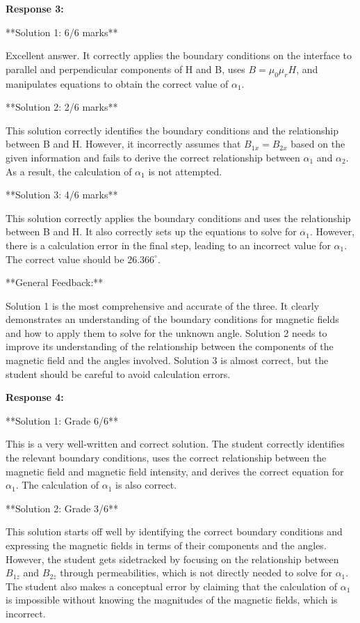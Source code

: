 \documentclass[a4paper,11pt]{article}
\begin{document}
\textbf{Response 3:}

**Solution 1: 6/6 marks**

Excellent answer. It correctly applies the boundary conditions on the interface to parallel and perpendicular components of H and B, uses \( B = \mu_0 \mu_r H \), and manipulates equations to obtain the correct value of \( \alpha_1 \).

**Solution 2: 2/6 marks**

This solution correctly identifies the boundary conditions and the relationship between B and H. However, it incorrectly assumes that \( B_{1x} = B_{2x} \) based on the given information and fails to derive the correct relationship between \( \alpha_1 \) and \( \alpha_2 \). As a result, the calculation of \( \alpha_1 \) is not attempted.

**Solution 3: 4/6 marks**

This solution correctly applies the boundary conditions and uses the relationship between B and H. It also correctly sets up the equations to solve for \( \alpha_1 \). However, there is a calculation error in the final step, leading to an incorrect value for \( \alpha_1 \). The correct value should be \(26.366^\circ\).

**General Feedback:**

Solution 1 is the most comprehensive and accurate of the three. It clearly demonstrates an understanding of the boundary conditions for magnetic fields and how to apply them to solve for the unknown angle. Solution 2 needs to improve its understanding of the relationship between the components of the magnetic field and the angles involved. Solution 3 is almost correct, but the student should be careful to avoid calculation errors.

\textbf{Response 4:}

**Solution 1: Grade 6/6**

This is a very well-written and correct solution. The student correctly identifies the relevant boundary conditions, uses the correct relationship between the magnetic field and magnetic field intensity, and derives the correct equation for \(\alpha_{1}\). The calculation of \(\alpha_{1}\) is also correct.

**Solution 2: Grade 3/6**

This solution starts off well by identifying the correct boundary conditions and expressing the magnetic fields in terms of their components and the angles. However, the student gets sidetracked by focusing on the relationship between \(B_{1z}\) and \(B_{2z}\) through permeabilities, which is not directly needed to solve for \(\alpha_{1}\). The student also makes a conceptual error by claiming that the calculation of \(\alpha_{1}\) is impossible without knowing the magnitudes of the magnetic fields, which is incorrect. 
\end{document}
